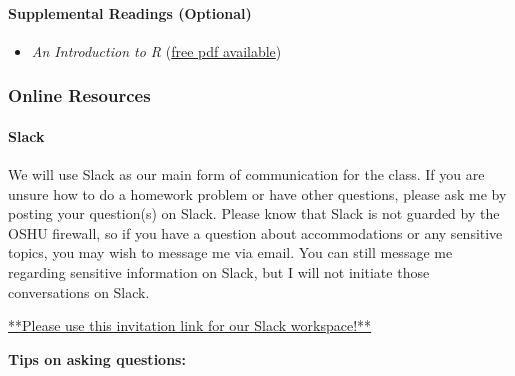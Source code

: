 \documentclass[
  letterpaper,
  DIV=11,
  numbers=noendperiod]{scrartcl}
\let\oldparagraph\paragraph
\renewcommand{\paragraph}[1]{\oldparagraph{#1}\mbox{}}
\providecommand{\tightlist}{%
  \setlength{\itemsep}{0pt}\setlength{\parskip}{0pt}}\usepackage{longtable,booktabs,array}
\begin{document}
\hypertarget{supplemental-readings-optional}{%
\paragraph{Supplemental Readings
(Optional)}\label{supplemental-readings-optional}}

\begin{itemize}
\tightlist
\item
  \emph{An Introduction to R}
  (\href{http://cran.r-project.org/manuals.html}{free pdf available})
\end{itemize}

\hypertarget{online-resources}{%
\subsubsection{Online Resources}\label{online-resources}}

\hypertarget{slack}{%
\paragraph{Slack}\label{slack}}

We will use Slack as our main form of communication for the class. If
you are unsure how to do a homework problem or have other questions,
please ask me by posting your question(s) on Slack. Please know that
Slack is not guarded by the OSHU firewall, so if you have a question
about accommodations or any sensitive topics, you may wish to message me
via email. You can still message me regarding sensitive information on
Slack, but I will not initiate those conversations on Slack.

\href{https://join.slack.com/t/slack-kp94638/shared_invite/zt-2fwl1ziz7-K98XEP_8qLEMzagVlzJWbQ}{**Please
use this invitation link for our Slack workspace!**}

\textbf{Tips on asking questions:}
\end{document}
